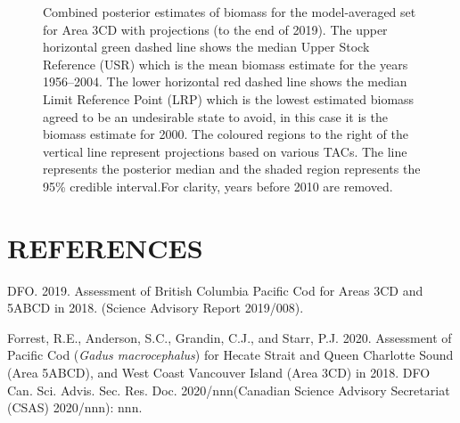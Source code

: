 \documentclass[11pt]{book}
\begin{document}
\clearpage
\begin{figure}[htb]

{\centering {} 

}

\caption{Combined posterior estimates of biomass for the model-averaged set for Area 3CD with projections (to the end of 2019).  The upper horizontal green dashed line shows the median Upper Stock Reference (USR) which is the mean biomass estimate for the years 1956--2004. The lower horizontal red dashed line shows the median Limit Reference Point (LRP) which is the lowest estimated biomass agreed to be an undesirable state to avoid, in this case it is the biomass estimate for 2000. The coloured regions to the right of the vertical line represent projections based on various TACs. The line represents the posterior median and the shaded region represents the 95\% credible interval.For clarity, years before 2010 are removed.}\label{fig:fig-model-average-biomass-3cd-proj}
\end{figure}
\clearpage

\hypertarget{references}{%
\section*{REFERENCES}\label{references}}
{}
\noindent
\vspace{-2em}
\setlength{\parindent}{-0.2in}
\setlength{\leftskip}{0.2in}
\setlength{\parskip}{8pt}

\hypertarget{refs}{}
\leavevmode\hypertarget{ref-dfo2019}{}%
DFO. 2019. Assessment of British Columbia Pacific Cod for Areas 3CD and 5ABCD in 2018. (Science Advisory Report 2019/008).

\leavevmode\hypertarget{ref-forrest2020}{}%
Forrest, R.E., Anderson, S.C., Grandin, C.J., and Starr, P.J. 2020. Assessment of Pacific Cod (\emph{Gadus macrocephalus}) for Hecate Strait and Queen Charlotte Sound (Area 5ABCD), and West Coast Vancouver Island (Area 3CD) in 2018. DFO Can. Sci. Advis. Sec. Res. Doc. 2020/nnn(Canadian Science Advisory Secretariat (CSAS) 2020/nnn): nnn.

\setlength{\parindent}{0in} \setlength{\leftskip}{0in} \setlength{\parskip}{4pt}

\end{document}
